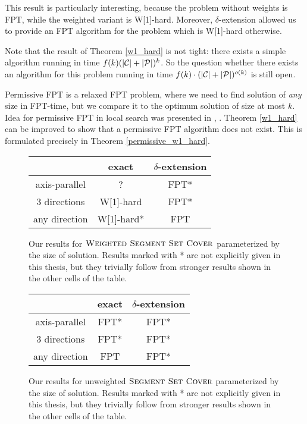 This result is particularly interesting,
because the problem without weights is FPT,
while the weighted variant is W[1]-hard.
Moreover, $\delta$-extension allowed us to provide an FPT algorithm
for the problem which is W[1]-hard otherwise.

Note that the result of Theorem \ref{w1_hard} is not tight:
there exists a simple algorithm 
running in time ${f(k)(|\mathcal{C}| + |\mathcal{P}|)^k}$.
So the question whether there exists an algorithm
for this problem running in time ${f(k)\cdot(|\mathcal{C}| + |\mathcal{P}|)^{o(k)}}$
is still open.

Permissive FPT is a relaxed FPT problem, where 
we need to find solution of \textit{any} size in FPT-time,
but we compare it to the optimum solution of size at most $k$.
Idea for permissive FPT in local search was presented
in \cite{permissive_problem1}, \cite{permissive_problem2}.
Theorem \ref{w1_hard} can be improved to show that a permissive FPT
algorithm does not exist.
This is formulated precisely in Theorem \ref{permissive_w1_hard}.

\begin{figure}[h]
\begin{center}
\begin{tabular}{ | c | c | c | }
\hline
                & exact     & $\delta$-extension \\ 
\hline                
 axis-parallel   & ? & FPT* \\  
\hline                
 3 directions    & W[1]-hard & FPT* \\  
\hline                
 any direction   & W[1]-hard* & FPT \\
\hline                
\end{tabular}
\caption{Our results for $\textsc{Weighted Segment Set Cover}$
parameterized by the size of solution.
Results marked with * are not explicitly given in this thesis,
but they trivially follow from stronger results shown in the other cells of the table.}
\label{tab:weighted_fpt}
\end{center}
\end{figure}

\begin{figure}[h]
\begin{center}
\begin{tabular}{ | c | c | c | }
\hline
                & exact     & $\delta$-extension \\ 
\hline                
 axis-parallel   & FPT* & FPT* \\  
\hline                
 3 directions    & FPT* & FPT* \\  
\hline                
 any direction   & FPT  & FPT* \\
\hline                
\end{tabular}
\caption{Our results for unweighted $\textsc{Segment Set Cover}$
parameterized by the size of solution.
Results marked with * are not explicitly given in this thesis,
but they trivially follow from stronger results shown in the other cells of the table.}
\label{tab:unweighted_fpt}
\end{center}
\end{figure}

